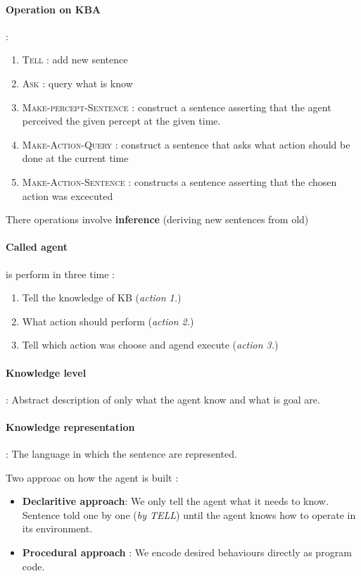 \paragraph{Operation on KBA} :
\begin{enumerate}
    \item \textsc{Tell} : add new sentence
    \item \textsc{Ask} : query what is know

    \item \textsc{Make-percept-Sentence} : construct a sentence asserting that the agent perceived
        the given percept at the given time.
    \item \textsc{Make-Action-Query} : construct a sentence that asks what action should be done at the current time
    \item \textsc{Make-Action-Sentence} : constructs a sentence asserting that the chosen action was excecuted
\end{enumerate}

There operations involve \textbf{inference} (deriving new sentences from old)

\paragraph{Called agent} is perform in three time :
\begin{enumerate}
    \item Tell the knowledge of KB (\textit{action 1.})
    \item What action should perform (\textit{action 2.})
    \item Tell which action was choose and agend execute (\textit{action 3.})
\end{enumerate}

\paragraph{Knowledge level} : Abstract description of only what the agent know and what is goal are.

\paragraph{Knowledge representation} : The language in which the sentence are represented.

Two approac on how the agent is built :
	\begin{itemize}
        \item \textbf{Declaritive approach}:  We only tell the agent what it needs to know. Sentence told one by one  (\textit{by TELL}) until the agent knows how to operate in its environment.
    \item \textbf{Procedural approach} : We encode desired behaviours directly as program code.
	\end{itemize}
